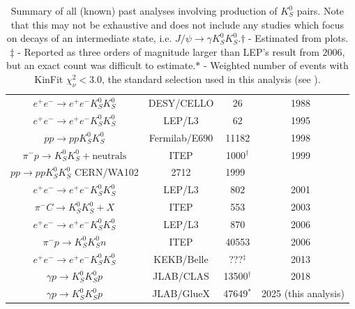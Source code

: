 \begin{table}
\begin{center}
\begin{tabular}{cccc}
$e^+e^- \to e^+e^- K_S^0 K_S^0$ & DESY/CELLO & 26 & 1988~\cite{Behrend1989}\\
$e^+e^- \to e^+e^- K_S^0 K_S^0$ & LEP/L3 & 62 & 1995~\cite{Acciarri1995}\\
$pp \to pp K_S^0 K_S^0$ & Fermilab/E690 & 11182 & 1998~\cite{Reyes1998}\\
$\pi^- p \to K_S^0 K_S^0 + \text{neutrals}$ & ITEP & 1000${}^\dagger$ & 1999~\cite{Barkov1999}\\
$pp \to pp K_S^0 K_S^0$ CERN/WA102 & 2712 & 1999~\cite{Barberis1999}\\
    $e^+e^- \to e^+e^- K_S^0 K_S^0$ & LEP/L3 & 802 & 2001~\cite{Acciarri2001}\\
  $\pi^- C \to K_S^0 K_S^0 + X$ & ITEP & 553 & 2003~\cite{Tikhomirov2003}\\
      $e^+e^- \to e^+e^- K_S^0 K_S^0$ & LEP/L3 & 870 & 2006~\cite{Schegelsky2006}\\
    $\pi^- p \to K_S^0 K_S^0 n$ & ITEP & 40553 & 2006~\cite{Vladimirsky2006}\\
    $e^+e^- \to e^+e^- K_S^0 K_S^0$ & KEKB/Belle & ???${}^\ddagger$ & 2013~\cite{Uehara2013}\\
    $\gamma p \to K_S^0 K_S^0 p$ & JLAB/CLAS & 13500${}^\dagger$ & 2018~\cite{Chandavar2018}\\
      $\gamma p \to K_S^0 K_S^0 p$ & JLAB/GlueX & 47649${}^\ast$ & 2025 (this analysis)\\\bottomrule
    \end{tabular}
    \caption{Summary of all (known) past analyses involving production of $K_S^0$ pairs. Note that this may not be exhaustive and does not include any studies which focus on decays of an intermediate state, i.e. $J/\psi \to \gamma K_S^0K_S^0$.\newline$\dagger$ - Estimated from plots.\newline$\ddagger$ - Reported as three orders of magnitude larger than LEP's result from 2006, but an exact count was difficult to estimate.\newline$\ast$ - Weighted number of events with KinFit $\chi^2_\nu < 3.0$, the standard selection used in this analysis (see ).}\label{tab:past-analyses}
  \end{center}
\end{table}

